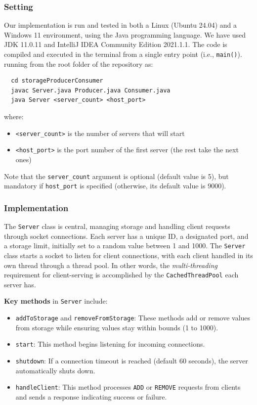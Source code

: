 \documentclass[acmlarge]{acmart}
\begin{document}
\subsubsection{Setting}
Our implementation is run and tested in both a Linux (Ubuntu 24.04) and a Windows 11 environment, using the Java programming language.
We have used JDK 11.0.11 and IntelliJ IDEA Community Edition 2021.1.1.
The code is compiled and executed in the terminal from a single entry point (i.e., \texttt{main()}).
running from the root folder of the repository as:
\begin{verbatim}
  cd storageProducerConsumer
  javac Server.java Producer.java Consumer.java
  java Server <server_count> <host_port>
\end{verbatim}
where:
\begin{itemize}
  \item \texttt{<server\_count>} is the number of servers that will start
  \item \texttt{<host\_port>} is the port number of the first server (the rest take the next ones)
\end{itemize}

Note that the \texttt{server\_count} argument is optional (default value is 5), but mandatory if
\texttt{host\_port} is specified (otherwise, its default value is 9000).

\subsubsection{Implementation}
The \texttt{Server} class is central, managing storage and handling client requests through socket connections.
Each server has a unique ID, a designated port, and a storage limit, initially set to a random value between 1 and 1000.
The \texttt{Server} class starts a socket to listen for client connections, with each client handled in its own
thread through a thread pool.
In other words, the \textit{multi-threading} requirement for client-serving is accomplished by the
\texttt{CachedThreadPool} each server has.

\textbf{Key methods} in \texttt{Server} include:
\begin{itemize}
  \item \texttt{addToStorage} and \texttt{removeFromStorage}: These methods add or remove values from storage while ensuring values stay within bounds (1 to 1000).
  \item \texttt{start}: This method begins listening for incoming connections.
  \item \texttt{shutdown}: If a connection timeout is reached (default 60 seconds), the server automatically shuts down.
  \item \texttt{handleClient}: This method processes \texttt{ADD} or \texttt{REMOVE} requests from clients and sends a response indicating success or failure.
\end{itemize}
\end{document}
